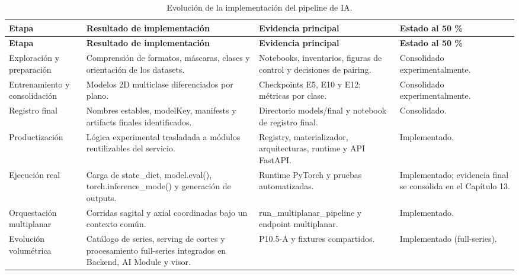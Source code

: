 \begin{longtable}{|>{\raggedright\arraybackslash}p{}|>{\raggedright\arraybackslash}p{}|>{\raggedright\arraybackslash}p{}|>{\raggedright\arraybackslash}p{}|}
\caption{Evolución de la implementación del pipeline de IA.}
\label{tab:anexo-f-pipeline-inferencia}\\
\hline
\textbf{Etapa} & \textbf{Resultado de implementación} & \textbf{Evidencia principal} & \textbf{Estado al 50 \%} \\
\hline
\endfirsthead
\hline
\textbf{Etapa} & \textbf{Resultado de implementación} & \textbf{Evidencia principal} & \textbf{Estado al 50 \%} \\
\hline
\endhead
Exploración y preparación & Comprensión de formatos, máscaras, clases y orientación de los datasets. & Notebooks, inventarios, figuras de control y decisiones de pairing. & Consolidado experimentalmente. \\
\hline
Entrenamiento y consolidación & Modelos 2D multiclase diferenciados por plano. & Checkpoints E5, E10 y E12; métricas por clase. & Consolidado experimentalmente. \\
\hline
Registro final & Nombres estables, modelKey, manifests y artifacts finales identificados. & Directorio models/final y notebook de registro final. & Consolidado. \\
\hline
Productización & Lógica experimental trasladada a módulos reutilizables del servicio. & Registry, materializador, arquitecturas, runtime y API FastAPI. & Implementado. \\
\hline
Ejecución real & Carga de state\_dict, model.eval(), torch.inference\_mode() y generación de outputs. & Runtime PyTorch y pruebas automatizadas. & Implementado; evidencia final se consolida en el Capítulo 13. \\
\hline
Orquestación multiplanar & Corridas sagital y axial coordinadas bajo un contexto común. & run\_multiplanar\_pipeline y endpoint multiplanar. & Implementado. \\
\hline
Evolución volumétrica & Catálogo de series, serving de cortes y procesamiento full-series integrados en Backend, AI Module y visor. & P10.5-A y fixtures compartidos. & Implementado (full-series). \\
\hline
\end{longtable}

